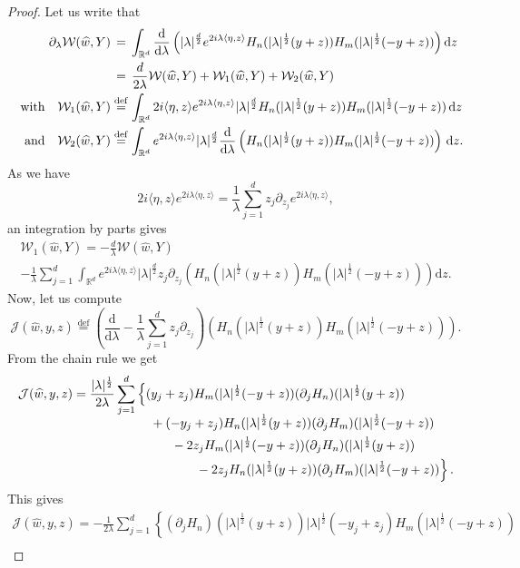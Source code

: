 \documentclass[11pt]{article}
\theoremstyle{definition}
\numberwithin{equation}{section}
\numberwithin{figure}{section}
\numberwithin{table}{section}
\newcommand{\lam}{\lambda}
\newcommand{\wh}{\widehat}
\newcommand*\cJ{\mathcal{J}}
\newcommand*\cW{\mathcal{W}}
\newcommand*\R{\mathbb{R}}
\newcommand{\andf}{\quad\hbox{and}\quad}
\newcommand{\with}{\quad\hbox{with}\quad}
\newcommand*\eqdefa{\overset{\mathrm{def}}{=}}
\newcommand*\peqdefa{\overset{\phantom{\mathrm{def}}}{=}}
\newcommand*{\dd}{\mathrm{d}}
\newcommand{\dz}{\dd z}
\newcommand{\dlambda}{\dd \lambda}
\renewcommand*{\cdotp}{.}
\begin{document}
\begin{proof}
Let us write that
\[
\begin{aligned}
\partial_\lam \cW(\wh w,Y) &\peqdefa \int_{\R^d} \frac{\dd}{\dlambda} \left(|\lam|^{\frac d 2} e^{2i\lam\langle \eta,z\rangle} H_n (|\lam|^{\frac 12} (y+z)) H_m(|\lam|^{\frac 12} (-y+z)) \right) \dz\\
&\peqdefa \frac d {2\lam} \cW(\wh w,Y) +\cW_1(\wh w,Y) + \cW_2(\wh w,Y) \\ \with
\cW_1(\wh w,Y) &\eqdefa
\int_{\R^d} 2i\langle \eta,z\rangle e^{2i\lam\langle \eta,z\rangle} |\lam|^{\frac d 2} H_n (|\lam|^{\frac 12} (y+z)) H_m(|\lam|^{\frac 12} (-y+z))\, \dz\\
\andf \cW_2(\wh w,Y) &\eqdefa
\int_{\R^d} e^{2i\lam\langle \eta,z\rangle} |\lam|^{\frac d 2} \frac{\dd}{\dlambda} \left(H_n (|\lam|^{\frac 12} (y+z)) H_m(|\lam|^{\frac 12} (-y+z))\right)\, \dz.
\end{aligned}
\]
As we have
\[
2i\langle \eta,z\rangle e^{2i\lam\langle \eta,z\rangle } = \frac 1 \lam \sum_{j=1}^d z_j\partial_{z_j} e^{2i\lam\langle \eta,z\rangle },
\]
an integration by parts gives
\begin{multline*}
\cW_1(\wh w,Y) = -\frac d {\lam} \cW(\wh w,Y)\\  -\frac1\lambda \sum_{j=1} ^d \int_{\R^d} e^{2i\lam\langle \eta,z\rangle} |\lam|^{\frac d 2} z_j\partial_{z_j} \left(H_n (|\lam|^{\frac 12} (y+z)) H_m(|\lam|^{\frac 12} (-y+z))\right) \dz.
\end{multline*}
Now, let us compute
\[
\cJ(\wh w,y,z) \eqdefa \left (\frac{\dd}{\dlambda} -\frac1\lambda\sum_{j=1}^d z_j\partial_{z_j}\right) \left(H_n (|\lam|^{\frac 12} (y+z)) H_m(|\lam|^{\frac 12} (-y+z))\right).
\]
From the chain rule we get
\begin{align*}
\cJ(\wh w,y,z) &= \frac {|\lam|^{\frac 12} }{2\lam} \sum_{j=1}^d \left\{ (y_j+z_j) H_m(|\lam|^{\frac 12} (-y+z)) (\partial_j H_n) (|\lam|^{\frac 12} (y+z))\right. \\[-0.5em]
&\mkern 110mu+(-y_j+z_j) H_n (|\lam|^{\frac 12} (y+z)) (\partial_j H_m)(|\lam|^{\frac 12} (-y+z))\\
&\mkern 140mu- 2 z_j H_m(|\lam|^{\frac 12} (-y+z)) (\partial_jH_n) (|\lam|^{\frac 12} (y+z))\\
&\mkern 170mu\left.{} -2 z_j H_n (|\lam|^{\frac 12} (y+z)) (\partial_j H_m)(|\lam|^{\frac 12} (-y+z))
\right\}\cdotp
\end{align*}
This gives
\begin{multline*}
\cJ(\wh w,y,z) = - \frac {1 }{2\lam} \sum_{j=1}^d \left\{ (\partial_j H_n) (|\lam|^{\frac 12} (y+z)) |\lam|^{\frac 12}(-y_j+z_j) H_m(|\lam|^{\frac 12} (-y+z))\right.\\[-0.3em]

\end{multline*}
\end{proof}
\end{document}
